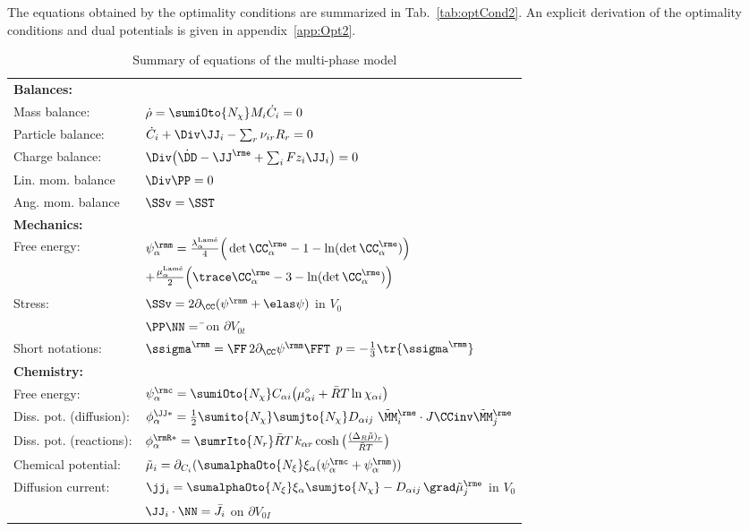 The equations obtained by the optimality conditions are summarized in Tab.~{\ref{tab:optCond2}}. An explicit derivation of the optimality conditions and dual potentials is given in appendix~\ref{app:Opt2}. 

\begin{table}[H]
  \small
  \centering
  \caption{Summary of equations of the multi-phase model}
  \begin{tabular}{| l l |}
    \hline
    \bf Balances: & \\
    Mass balance: & $\dot\rho=\sumiOto{\Nchi} M_i \dot C_i = 0$ \\
    Particle balance: & $ \dot C_i + \Div\JJ_i - \sum_r \nuir R_r = 0$  \\
    Charge balance: & $\Div\big(\dot\DD-\JJe+\sum_i Fz_i\JJ_i\big) = 0$ \\
    Lin. mom. balance & $\Div\PP=0$ \\
    Ang. mom. balance & $\SSv=\SST$ \\
    \hline
    \bf Mechanics: & \\
    Free energy: & $\psima = \frac{\lambda^{\text{Lam\'e}}_{\alpha}}{4}\Big(\det\CCe_{\alpha}-1-\ln(\det\CCe_{\alpha})\Big)$ \\
    & \qquad $+ \frac{\mu^{\text{Lam\'e}}_{\alpha}}{2}\Big(\trace\CCe_{\alpha}-3-\ln(\det\CCe_{\alpha})\Big)$ \\
    Stress:  & $\SSv = 2\dCC(\psim+\psie)$ \quad in $V_0$ \\
    & $\PP\NN=\bar\tt$ \quad on $\partial V_{0t}$ \\
    Short notations:  & $\ssigmam = \FF\,2\dCC\psim\FFT$ \qquad $p = -\frac{1}{3}\tr{\ssigmam}$ \\
    \hline
    \bf Chemistry: & \\
    Free energy: & $\psica =  \sumiOto{\Nchi} \Cai \big(\munordai + \RT\ln\chiai \big)$ \\
    Diss. pot. (diffusion): & $\phiJJsa= \frac{1}{2} \sumito{\Nchi}\sumjto{\Nchi} \Daij \ \MMetilde_i \cdot J\CCinv \MMetilde_j$\\
    Diss. pot. (reactions): & $ \phiRsa= \sumrIto{N_r} \RT \,k_{\alpha r}\cosh\big(\frac{(\Delta_R\tilde\mu)_r}{\RT}\big) $  \\
    Chemical potential: & $\tilde\mu_i = \dCi(\sumalphaOto{\Nxi}\xia (\psica+\psima))$ \\
    Diffusion current: & $\jj_i = \sumalphaOto{\Nxi}\xia \sumjto{\Nchi} -\Daij\,\grad\muetilde_j $ \quad in $V_0$ \\
    &  $\JJ_i\cdot\NN = \bar J_i$ \quad on $\partial V_{0I}$ \\

\end{tabular}
\end{table}
